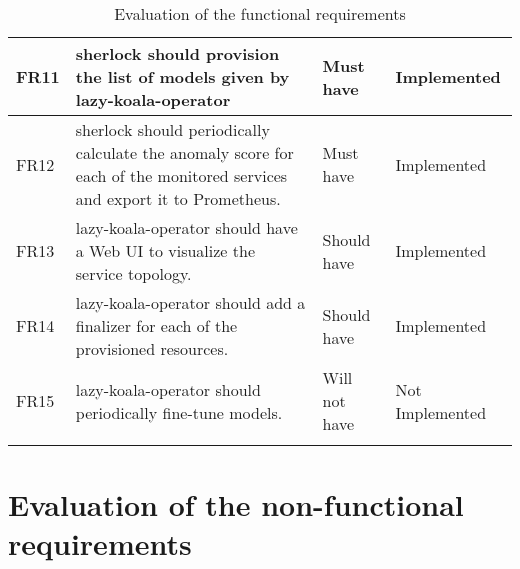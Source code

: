 \begin{longtable}{|p{13mm}|p{80mm}|p{26mm}|p{27mm}|}
    FR11 & \ac{sherlock} should provision the list of models given by \ac{lazy-koala-operator} & Must have & Implemented \\ \hline
    FR12 & \ac{sherlock} should periodically calculate the anomaly score for each of the monitored services and export it to Prometheus. & Must have & Implemented \\ \hline
    FR13 & \ac{lazy-koala-operator} should have a Web UI to visualize the service topology. & Should have & Implemented \\ \hline
    FR14 & \ac{lazy-koala-operator} should add a finalizer for each of the provisioned resources. & Should have & Implemented \\ \hline
    FR15 & \ac{lazy-koala-operator} should periodically fine-tune models. & Will not have & Not Implemented \\ \hline
    \caption{Evaluation of the functional requirements}
\end{longtable}



\section{Evaluation of the non-functional requirements}\label{appendix:evaluation-non-functional-requirements}


